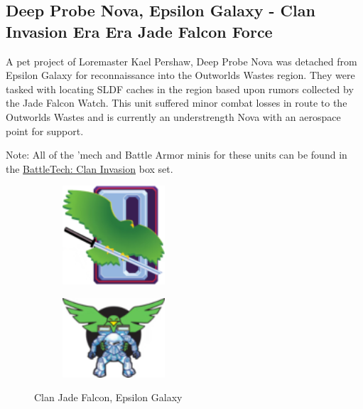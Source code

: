 \subsection{Deep Probe Nova, Epsilon Galaxy - Clan Invasion Era Era Jade Falcon Force}

A pet project of Loremaster Kael Pershaw, Deep Probe Nova was detached from Epsilon Galaxy for reconnaissance into the Outworlds Wastes region.
They were tasked with locating SLDF caches in the region based upon rumors collected by the Jade Falcon Watch.
This unit suffered minor combat losses in route to the Outworlds Wastes and is currently an understrength Nova with an aerospace point for support.
          	
Note: All of the 'mech and Battle Armor minis for these units can be found in the \href{https://www.sarna.net/wiki/BattleTech:_Clan_Invasion}{BattleTech: Clan Invasion} box set. 

\begin{figure}[!h]
  \begin{center}
  \begin{subfigure}{0.4\textwidth}
  \centering
  \includegraphics[alt='Clan Jade Falcon Logo', width=1.5in, height=1.444in]{img/Jade-Falcon.png}
  \end{subfigure}
  \hspace{1in}
  \begin{subfigure}{0.4\textwidth}
  \centering
  \includegraphics[alt='Epsilon Galaxy Logo', width=1.5in, height=1.167in]{img/Epsilon-Galaxy.png}
  \end{subfigure}
  \caption*{Clan Jade Falcon, Epsilon Galaxy}
  \end{center}
\end{figure}

